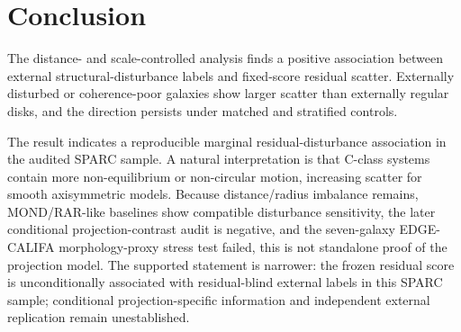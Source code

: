 \documentclass[11pt]{article}
\begin{document}
\section{Conclusion}
The distance- and scale-controlled analysis finds a positive association between external structural-disturbance labels and fixed-score residual scatter. Externally disturbed or coherence-poor galaxies show larger scatter than externally regular disks, and the direction persists under matched and stratified controls.

The result indicates a reproducible marginal residual-disturbance association in the audited SPARC sample. A natural interpretation is that C-class systems contain more non-equilibrium or non-circular motion, increasing scatter for smooth axisymmetric models. Because distance/radius imbalance remains, MOND/RAR-like baselines show compatible disturbance sensitivity, the later conditional projection-contrast audit is negative, and the seven-galaxy EDGE-CALIFA morphology-proxy stress test failed, this is not standalone proof of the projection model. The supported statement is narrower: the frozen residual score is unconditionally associated with residual-blind external labels in this SPARC sample; conditional projection-specific information and independent external replication remain unestablished.
\end{document}
